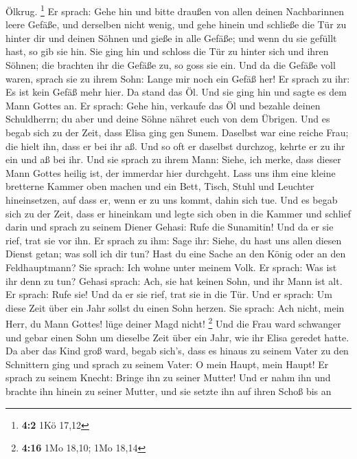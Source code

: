 Ölkrug. \footnote{\textbf{4:2} 1Kö 17,12}  Er sprach: Gehe
hin und bitte draußen von allen deinen Nachbarinnen leere Gefäße, und
derselben nicht wenig,  und gehe hinein und schließe die
Tür zu hinter dir und deinen Söhnen und gieße in alle Gefäße; und wenn
du sie gefüllt hast, so gib sie hin.  Sie ging hin und
schloss die Tür zu hinter sich und ihren Söhnen; die brachten ihr die
Gefäße zu, so goss sie ein.  Und da die Gefäße voll waren,
sprach sie zu ihrem Sohn: Lange mir noch ein Gefäß her! Er sprach zu
ihr: Es ist kein Gefäß mehr hier. Da stand das Öl.  Und
sie ging hin und sagte es dem Mann Gottes an. Er sprach: Gehe hin,
verkaufe das Öl und bezahle deinen Schuldherrn; du aber und deine Söhne
nähret euch von dem Übrigen.  Und es begab sich zu der
Zeit, dass Elisa ging gen Sunem. Daselbst war eine reiche Frau; die
hielt ihn, dass er bei ihr aß. Und so oft er daselbst durchzog, kehrte
er zu ihr ein und aß bei ihr.  Und sie sprach zu ihrem
Mann: Siehe, ich merke, dass dieser Mann Gottes heilig ist, der immerdar
hier durchgeht.  Lass uns ihm eine kleine bretterne
Kammer oben machen und ein Bett, Tisch, Stuhl und Leuchter hineinsetzen,
auf dass er, wenn er zu uns kommt, dahin sich tue.  Und
es begab sich zu der Zeit, dass er hineinkam und legte sich oben in die
Kammer und schlief darin  und sprach zu seinem Diener
Gehasi: Rufe die Sunamitin! Und da er sie rief, trat sie vor ihn.
 Er sprach zu ihm: Sage ihr: Siehe, du hast uns allen
diesen Dienst getan; was soll ich dir tun? Hast du eine Sache an den
König oder an den Feldhauptmann? Sie sprach: Ich wohne unter meinem
Volk.  Er sprach: Was ist ihr denn zu tun? Gehasi sprach:
Ach, sie hat keinen Sohn, und ihr Mann ist alt.  Er
sprach: Rufe sie! Und da er sie rief, trat sie in die Tür.
 Und er sprach: Um diese Zeit über ein Jahr sollst du
einen Sohn herzen. Sie sprach: Ach nicht, mein Herr, du Mann Gottes!
lüge deiner Magd nicht! \footnote{\textbf{4:16} 1Mo 18,10; 1Mo 18,14}
 Und die Frau ward schwanger und gebar einen Sohn um
dieselbe Zeit über ein Jahr, wie ihr Elisa geredet hatte.
 Da aber das Kind groß ward, begab sich's, dass es hinaus
zu seinem Vater zu den Schnittern ging  und sprach zu
seinem Vater: O mein Haupt, mein Haupt! Er sprach zu seinem Knecht:
Bringe ihn zu seiner Mutter!  Und er nahm ihn und brachte
ihn hinein zu seiner Mutter, und sie setzte ihn auf ihren Schoß bis an
